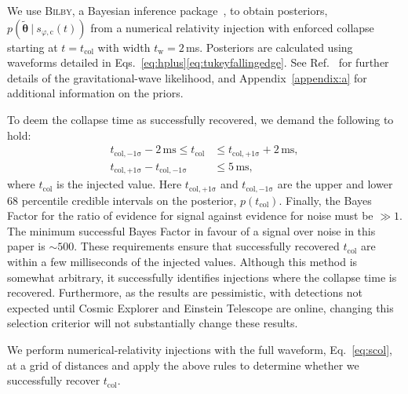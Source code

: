 \documentclass[
reprint,
prd,
twocolumn,
nofootinbib,
tightenlines %
floatfix,
 amsmath,
showpacs ,amssymb, aps,%
superscriptaddress
]{revtex4-1}
\newcommand{\tc}{t_{\mathrm{col}}}
\newcommand{\tcu}{t_{\mathrm{col,+1\sigma}}}
\newcommand{\tcl}{t_{\mathrm{col,-1\sigma}}}
\newcommand{\tw}{t_{\mathrm{w}}}
\begin{document}
    We use \textsc{Bilby}, a Bayesian inference package~\cite{Ashton2019}, to obtain posteriors, $p(\boldsymbol{\tilde{\theta}}~|~s_{\varphi,\mathrm{c}}(t))$ from a numerical relativity injection with enforced collapse starting at $t=\tc$ with width $\tw=2$\,ms.
    Posteriors are calculated using waveforms detailed in Eqs.~\ref{eq:hplus}\Hyphdash*\ref{eq:tukeyfallingedge}. 
    See Ref.~\cite{Easter2020} for further details of the gravitational-wave likelihood, and Appendix~\ref{appendix:a} for additional information on the priors.
    \par
    To deem the collapse time as successfully recovered, we demand the following to hold: 
\begin{align}
    \tcl - 2\,\mathrm{ms} \leqslant \tc & \leqslant  \tcu + 2\,\mathrm{ms},\\
    \tcu - \tcl & \leqslant  5\,\mathrm{ms},
\end{align}
    where $\tc$ is the injected value. 
    Here $\tcu$ and $\tcl$ are the upper and lower 68 percentile credible intervals on the posterior,  $p(\tc)$.
    Finally, the Bayes Factor for the ratio of evidence for signal against evidence for noise must be $\gg 1$.
    The minimum successful Bayes Factor in favour of a signal over noise in this paper is $\sim\!500$.
    These requirements ensure that successfully recovered $\tc$ are within a few milliseconds of the  injected values. 
    Although this method is somewhat arbitrary, it successfully identifies injections where the collapse time is recovered.
    Furthermore, as the results are pessimistic, with detections not expected until Cosmic Explorer and Einstein Telescope are online, changing this selection criterior will not substantially change these results. \par

    
    We perform numerical-relativity injections with the full waveform, Eq.~\ref{eq:scol}, at a grid of distances and apply the above rules to determine whether we successfully recover $\tc$.

\vspace{-0.25cm}    
\end{document}
